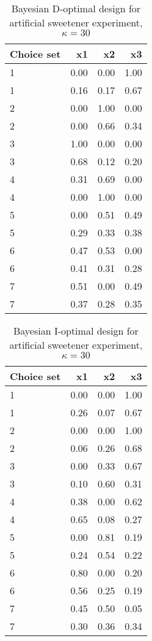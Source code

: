 \begin{table}[ht]
\centering
\begin{tabular}{lrrr}
  \hline
Choice set & x1 & x2 & x3 \\ 
  \hline
1 & 0.00 & 0.00 & 1.00 \\ 
  1 & 0.16 & 0.17 & 0.67 \\ 
  2 & 0.00 & 1.00 & 0.00 \\ 
  2 & 0.00 & 0.66 & 0.34 \\ 
  3 & 1.00 & 0.00 & 0.00 \\ 
  3 & 0.68 & 0.12 & 0.20 \\ 
  4 & 0.31 & 0.69 & 0.00 \\ 
  4 & 0.00 & 1.00 & 0.00 \\ 
  5 & 0.00 & 0.51 & 0.49 \\ 
  5 & 0.29 & 0.33 & 0.38 \\ 
  6 & 0.47 & 0.53 & 0.00 \\ 
  6 & 0.41 & 0.31 & 0.28 \\ 
  7 & 0.51 & 0.00 & 0.49 \\ 
  7 & 0.37 & 0.28 & 0.35 \\ 
   \hline
\end{tabular}
\caption{Bayesian D-optimal design for artificial sweetener experiment, $\kappa = 30$} 
\label{tab:cornell_exp_d_optimal_des_kappa_30}
\end{table}
\begin{table}[ht]
\centering
\begin{tabular}{lrrr}
  \hline
Choice set & x1 & x2 & x3 \\ 
  \hline
1 & 0.00 & 0.00 & 1.00 \\ 
  1 & 0.26 & 0.07 & 0.67 \\ 
  2 & 0.00 & 0.00 & 1.00 \\ 
  2 & 0.06 & 0.26 & 0.68 \\ 
  3 & 0.00 & 0.33 & 0.67 \\ 
  3 & 0.10 & 0.60 & 0.31 \\ 
  4 & 0.38 & 0.00 & 0.62 \\ 
  4 & 0.65 & 0.08 & 0.27 \\ 
  5 & 0.00 & 0.81 & 0.19 \\ 
  5 & 0.24 & 0.54 & 0.22 \\ 
  6 & 0.80 & 0.00 & 0.20 \\ 
  6 & 0.56 & 0.25 & 0.19 \\ 
  7 & 0.45 & 0.50 & 0.05 \\ 
  7 & 0.30 & 0.36 & 0.34 \\ 
   \hline
\end{tabular}
\caption{Bayesian I-optimal design for artificial sweetener experiment, $\kappa = 30$} 
\label{tab:cornell_exp_i_optimal_des_kappa_30}
\end{table}
